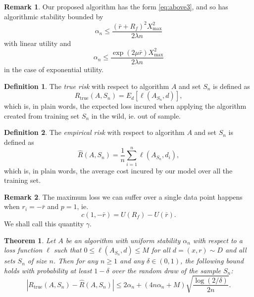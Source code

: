 \documentclass[11pt]{article}
\theoremstyle{plain}
\newtheorem{thm}{Theorem}
\theoremstyle{definition}
\newtheorem*{deff}{Definition}
\newtheorem*{rem}{Remark}
\begin{document}
\begin{rem}
  Our proposed algorithm has the form \eqref{eq:above3}, and so has algorithmic stability
  bounded by
  \begin{equation}
    \alpha_n \leq \frac{(\bar r+R_f)^2X^2_{\max}}{2\lambda n}
  \end{equation}
  with linear utility and
  \begin{equation}
    \alpha_n \leq \frac{\exp(2\mu\bar r)X^2_{\max}}{2\lambda n}
  \end{equation}
  in the case of exponential utility.
\end{rem}

\begin{deff}
  The \emph{true risk} with respect to algorithm $A$ and set $S_n$ is defined as
  \begin{equation}
    R_{\text{true}}(A,S_n) = E_d[\ell(A_{S_n},d)],
  \end{equation}
  which is, in plain words, the expected loss incured when applying the algorithm created
  from training set $S_n$ in the wild, ie. out of sample.
\end{deff}

\begin{deff}
  The \emph{empirical risk} with respect to algorithm $A$ and set $S_n$ is defined as
  \begin{equation}
    \hat R(A,S_n) = \frac{1}{n} \sum_{i=1}^n \ell(A_{S_n},d_i),
  \end{equation}
  which is, in plain words, the average cost incured by our model over all the training
  set.
\end{deff}

\begin{rem}
  The maximum loss we can suffer over a single data point happens when $r_i=-\bar r$ and
  $p=1$, ie.
  \begin{equation}
    c(1,-\bar r) = U(R_f) - U(\bar r).
  \end{equation}
  We shall call this quantity $\gamma$.
\end{rem}

\begin{thm}
  Let $A$ be an algorithm with uniform stability $\alpha_n$ with respect to a loss
  function $\ell$ such that $0\leq\ell(A_{S_n},d)\leq M$ for all $d=(x,r)\sim D$ and all sets
  $S_n$ of size $n$. Then for any $n\geq1$ and any $\delta\in(0,1)$, the following bound
  holds with probability at least $1-\delta$ over the random draw of the sample $S_n$:
  \begin{equation}
    |R_{\text{true}}(A,S_n) - \hat R(A,S_n)| \leq 2\alpha_n + (4n\alpha_n + M) \sqrt{\frac{\log(2/\delta)}{2n}}.
  \end{equation}
\end{thm}
\end{document}
